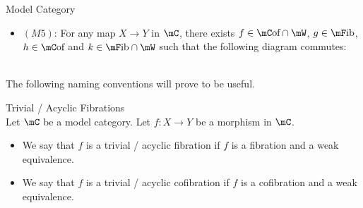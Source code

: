 \documentclass[a4paper]{article}
\begin{document}
\begin{defn}{Model Category}{}
\begin{itemize}
{}\\
In other words, $\mC\text{of}\cap\mW$ has the left lifting property with respect to $\mF\text{ib}$, and $\mC$ has the left lifting property with respect to $\mF\text{ib}\cap\mW$. 
\item $(M5)$: For any map $X\to Y$ in $\mC$, there exists $f\in\mC\text{of}\cap\mW$, $g\in\mF\text{ib}$, $h\in\mC\text{of}$ and $k\in\mF\text{ib}\cap\mW$ such that the following diagram commutes: \\
\\
\end{itemize}
\end{defn}

The following naming conventions will prove to be useful. 

\begin{defn}{Trivial / Acyclic Fibrations}{}\\ Let $\mC$ be a model category. Let $f:X\to Y$ be a morphism in $\mC$. 
\begin{itemize}
\item We say that $f$ is a trivial / acyclic fibration if $f$ is a fibration and a weak equivalence. 
\item We say that $f$ is a trivial / acyclic cofibration if $f$ is a cofibration and a weak equivalence. 
\end{itemize}
\end{defn}
\end{document}
